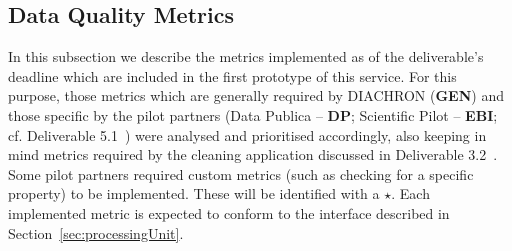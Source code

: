 
\subsection{Data Quality Metrics}
\label{sec:DQMetrics} 
In this subsection we describe the metrics implemented as of the deliverable's deadline which are included in the first prototype of this service.
For this purpose, those metrics which are generally required by DIACHRON (\textbf{GEN}) and those specific by the pilot partners (Data Publica – \textbf{DP};  Scientific Pilot – \textbf{EBI}; cf. Deliverable 5.1~\cite[section 4]{diachron-d5.1}) were analysed and prioritised accordingly, also keeping in mind metrics required by the cleaning application discussed in Deliverable 3.2~\cite{diachron-d3.2}.
Some pilot partners required custom metrics (such as checking for a specific property) to be implemented.
These will be identified with a $\star$.
Each implemented metric is expected to conform to the interface described in Section~\ref{sec:processingUnit}.






